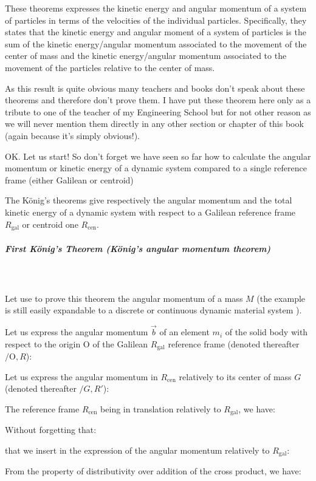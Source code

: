 	These theorems expresses the kinetic energy and angular momentum of a system of particles in terms of the velocities of the individual particles. Specifically, they states that the kinetic energy and angular moment of a system of particles is the sum of the kinetic energy/angular momentum associated to the movement of the center of mass and the kinetic energy/angular momentum associated to the movement of the particles relative to the center of mass.
	
	As this result is quite obvious many teachers and books don't speak about these theorems and therefore don't prove them. I have put these theorem here only as a tribute to one of the teacher of my Engineering School but for not other reason as we will never mention them directly in any other section or chapter of this book (again because it's simply obvious!).
	
	OK. Let us start! So don't forget we have seen so far how to calculate the angular momentum or kinetic energy of a dynamic system compared to a single reference frame (either Galilean or centroid)

	The König's theorems give respectively the angular momentum and the total kinetic energy of a dynamic system with respect to a Galilean reference frame $R_{\text{gal}}$ or centroid one $R_\text{cen}$.
	
	\subparagraph{First König's Theorem (König's angular momentum theorem)}\mbox{}\\\\
	Let use to prove this theorem the angular momentum of a mass $M$ (the example is still easily expandable to a discrete or continuous dynamic material system ).

	Let us express the angular momentum $\vec{b}$ of an element $m_i$ of the solid body with respect to the origin O of the Galilean $R_\text{gal}$ reference frame (denoted thereafter $/\text{O},R$):
	
	Let us express the angular momentum in $R_\text{cen}$ relatively to its center of mass $G$ (denoted thereafter $/G,R'$):
	
	The reference frame $R_{\text{cen}}$ being in translation relatively to $R_\text{gal}$, we have:
	
	Without forgetting that:
	
	that we insert in the expression of the angular momentum relatively to $R_\text{gal}$:
	
	From the property of distributivity over addition of the cross product, we have:
	
